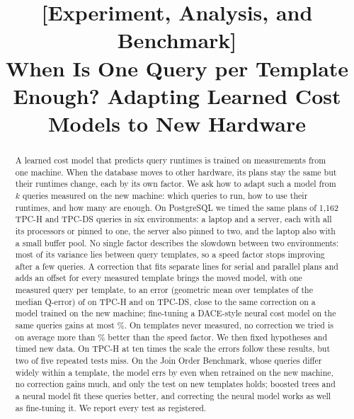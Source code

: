 \documentclass[conference]{IEEEtran}
\begin{document}
\title{[Experiment, Analysis, and Benchmark]\\When Is One Query per Template Enough? Adapting Learned Cost Models to New Hardware}

\author{
}

\maketitle

\begin{abstract}
A learned cost model that predicts query runtimes is trained on
measurements from one machine. When the database moves to other hardware, its plans stay the same
but their runtimes change, each by its own factor. We ask how to adapt such
a model from $k$ queries measured on the new machine: which queries to run,
how to use their runtimes, and how many are enough. On PostgreSQL we timed
the same plans of 1,162 TPC-H and TPC-DS queries in six environments: a
laptop and a server, each with all its processors or pinned to one, the
server also pinned to two, and the laptop also with a small buffer pool. No
single factor describes the slowdown between two environments: most of its
variance lies between query templates, so a speed factor stops improving
after a few queries. A correction that fits separate lines for serial and
parallel plans and adds an offset for every measured template brings the
moved model, with one measured query per template, to an error (geometric
mean over templates of the median Q-error) of
\PLadTpchLowdimTemplateRoundRobin{} on TPC-H and
\PLadTpcdsLowdimTemplateRoundRobin{} on TPC-DS, close to the same correction
on a model trained on the new machine; fine-tuning a DACE-style neural cost
model on the same queries gains at most \XtraNnGainPct\%. On templates never
measured, no correction we tried is on average more than \XtraHardBestPct\%
better than the speed factor. We then fixed hypotheses and timed new data.
On TPC-H at ten times the scale the errors follow these results, but two of
five repeated tests miss. On the Join Order Benchmark, whose queries differ
widely within a template, the model errs by \XJobKHOracle{} even when
retrained on the new machine, no correction gains much, and only the test
on new templates holds; boosted trees and a neural model fit these queries
better, and correcting the neural model works as well as fine-tuning it. We
report every test as registered.
\end{abstract}
\end{document}
